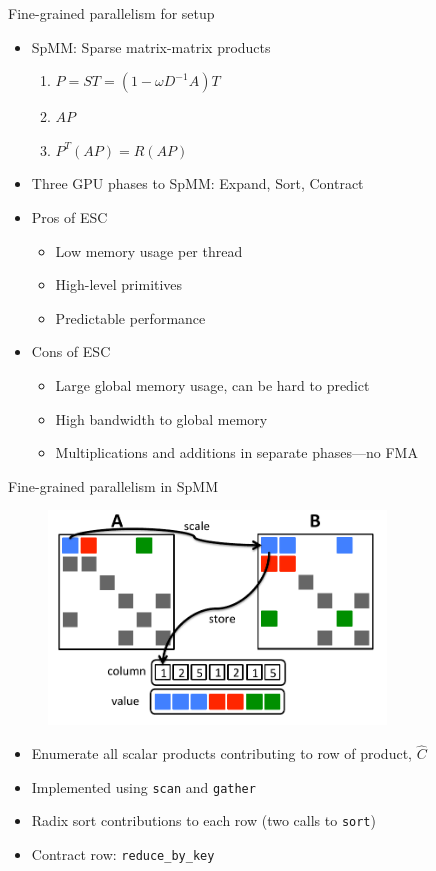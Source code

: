 \documentclass{beamer}
\begin{document}
\begin{frame}{Fine-grained parallelism for setup}
  \begin{itemize}
  \item SpMM: Sparse matrix-matrix products
    \begin{enumerate}
    \item $P = S T = (1 - \omega D^{-1}A) T$
    \item $A P$
    \item $P^T (A P) = R (A P)$
    \end{enumerate}
  \item Three GPU phases to SpMM: Expand, Sort, Contract
  \item Pros of ESC
    \begin{itemize}
    \item Low memory usage per thread
    \item High-level primitives
    \item Predictable performance
    \end{itemize}
  \item Cons of ESC
    \begin{itemize}
    \item Large global memory usage, can be hard to predict
    \item High bandwidth to global memory
    \item Multiplications and additions in separate phases---no FMA
    \end{itemize}
  \end{itemize}
\end{frame}

\begin{frame}{Fine-grained parallelism in SpMM}
  \begin{figure}
    \centering
    \includegraphics[width=0.8\textwidth]{figures/MG/SACUSPExpand}
  \end{figure}
  \begin{itemize}
  \item Enumerate all scalar products contributing to row of product, $\hat C$
  \item Implemented using \texttt{scan} and \texttt{gather}
  \item Radix sort contributions to each row (two calls to \texttt{sort})
  \item Contract row: \texttt{reduce\_by\_key}
  \end{itemize}
\end{frame}
\end{document}

